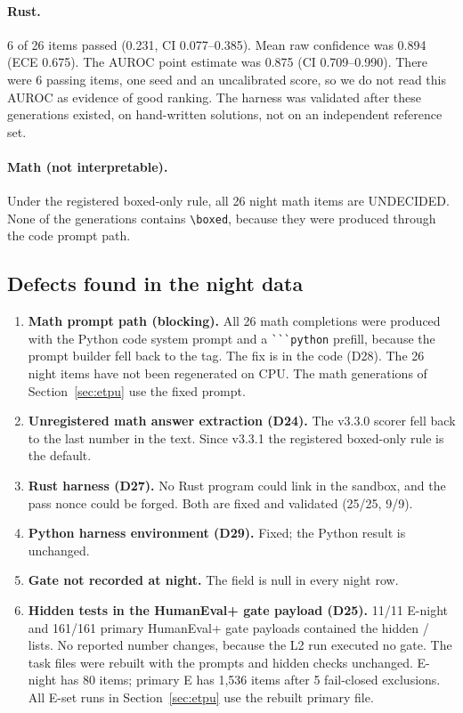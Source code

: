 \documentclass[11pt,a4paper]{article}
\newcommand{\code}[1]{\texttt{\detokenize{#1}}}
\begin{document}
\paragraph{Rust.} 6 of 26 items passed (0.231, CI 0.077--0.385). Mean raw confidence was 0.894
(ECE 0.675). The AUROC point estimate was 0.875 (CI 0.709--0.990). There were 6 passing items, one
seed and an uncalibrated score, so we do not read this AUROC as evidence of good ranking. The
harness was validated after these generations existed, on hand-written solutions, not on an
independent reference set.

\paragraph{Math (not interpretable).} Under the registered boxed-only rule, all 26 night math
items are UNDECIDED. None of the generations contains \verb|\boxed|, because they were produced
through the code prompt path.

\subsection{Defects found in the night data}\label{sec:defects}

\begin{enumerate}
\item \textbf{Math prompt path (blocking).} All 26 math completions were produced with the Python
  code system prompt and a \verb|```python| prefill, because the prompt builder fell back to the
  \code{python} tag. The fix is in the code (D28). The 26 night items have not been regenerated on
  CPU. The math generations of Section~\ref{sec:etpu} use the fixed prompt.
\item \textbf{Unregistered math answer extraction (D24).} The v3.3.0 scorer fell back to the last
  number in the text. Since v3.3.1 the registered boxed-only rule is the default.
\item \textbf{Rust harness (D27).} No Rust program could link in the sandbox, and the pass nonce
  could be forged. Both are fixed and validated (25/25, 9/9).
\item \textbf{Python harness environment (D29).} Fixed; the Python result is unchanged.
\item \textbf{Gate not recorded at night.} The \code{gate} field is null in every night row.
\item \textbf{Hidden tests in the HumanEval+ gate payload (D25).} 11/11 E-night and 161/161 primary
  HumanEval+ gate payloads contained the hidden \code{inputs}/\code{results} lists. No reported
  number changes, because the L2 run executed no gate. The task files were rebuilt with the prompts
  and hidden checks unchanged. E-night has 80 items; primary E has 1,536 items after 5 fail-closed
  exclusions. All E-set runs in Section~\ref{sec:etpu} use the rebuilt \code{.d25} primary file.
\end{enumerate}
\end{document}
